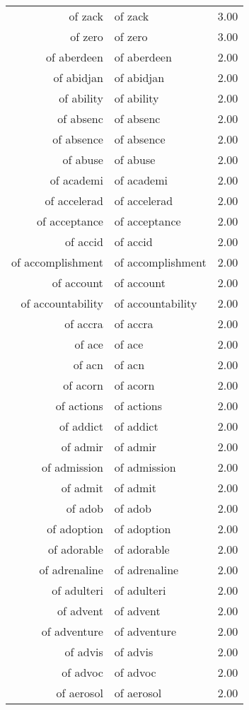 \begin{table}[ht]
\begin{tabular}{rlr}
  of zack & of zack & 3.00 \\ 
  of zero & of zero & 3.00 \\ 
  of aberdeen & of aberdeen & 2.00 \\ 
  of abidjan & of abidjan & 2.00 \\ 
  of ability & of ability & 2.00 \\ 
  of absenc & of absenc & 2.00 \\ 
  of absence & of absence & 2.00 \\ 
  of abuse & of abuse & 2.00 \\ 
  of academi & of academi & 2.00 \\ 
  of accelerad & of accelerad & 2.00 \\ 
  of acceptance & of acceptance & 2.00 \\ 
  of accid & of accid & 2.00 \\ 
  of accomplishment & of accomplishment & 2.00 \\ 
  of account & of account & 2.00 \\ 
  of accountability & of accountability & 2.00 \\ 
  of accra & of accra & 2.00 \\ 
  of ace & of ace & 2.00 \\ 
  of acn & of acn & 2.00 \\ 
  of acorn & of acorn & 2.00 \\ 
  of actions & of actions & 2.00 \\ 
  of addict & of addict & 2.00 \\ 
  of admir & of admir & 2.00 \\ 
  of admission & of admission & 2.00 \\ 
  of admit & of admit & 2.00 \\ 
  of adob & of adob & 2.00 \\ 
  of adoption & of adoption & 2.00 \\ 
  of adorable & of adorable & 2.00 \\ 
  of adrenaline & of adrenaline & 2.00 \\ 
  of adulteri & of adulteri & 2.00 \\ 
  of advent & of advent & 2.00 \\ 
  of adventure & of adventure & 2.00 \\ 
  of advis & of advis & 2.00 \\ 
  of advoc & of advoc & 2.00 \\ 
  of aerosol & of aerosol & 2.00 \\ 

\end{tabular}
\end{table}
